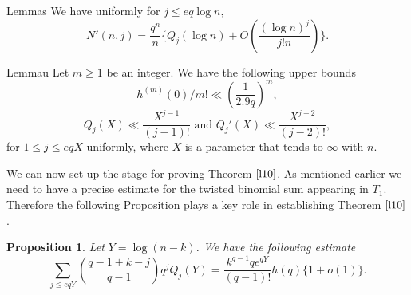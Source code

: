 \documentclass[12pt]{amsart}
\numberwithin{equation}{section}
\newtheorem{prop}[theorem]{Proposition}
\theoremstyle{remark}
\theoremstyle{remark}
\theoremstyle{definition}
\begin{document}
\begin{restatable}{Lemma}{s}\label{l11}
We have uniformly for $j\leqslant eq \log n,$
$$N'(n,j)=\dfrac{q^n}{n}\Bigg \{Q_j(\log n)+ O \left( \dfrac{(\log n)^j}{j!n}\right) \Bigg \}.$$
\end{restatable}
\begin{restatable}{Lemma}{u}\label{l12}
Let $m\geqslant 1$ be an integer. We have the following upper bounds
$$h^{(m)}(0)/m!\ll \left( \dfrac{1}{2.9q}\right)^m,$$
$$Q_j(X)\ll \dfrac{X^{j-1}}{(j-1)!}  \text{   and    } Q_j'(X) \ll \dfrac{X^{j-2}}{(j-2)!},$$
for $1\leqslant j\leqslant eq X$ uniformly, where $X$ is a parameter that tends to $\infty$ with $n.$
\end{restatable}
We can now set up the stage for proving Theorem $\ref{l10}$. As mentioned earlier we need to have a precise estimate for the twisted binomial sum appearing in $T_1$. Therefore the following Proposition plays a key role in establishing Theorem $\ref{l10}$.
\begin{prop}\label{l14}
Let $Y=\log(n-k)$. We have the following estimate
$$\displaystyle\sum\limits_{j\leqslant eqY}\displaystyle\binom{q-1+k-j}{q-1}q^j Q_j(Y)=\dfrac{k^{q-1}qe^{qY}}{(q-1)!}h(q)\Big\{1+o(1)\Big \}.$$
\end{prop}
\end{document}
